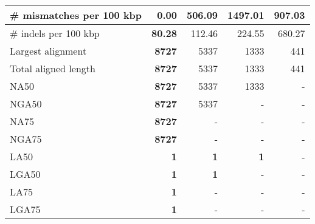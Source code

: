 \documentclass[12pt,a4paper]{article}
\begin{document}
\begin{table}[ht]
\begin{center}
\begin{tabular}{|l*{4}{|r}|}
\# mismatches per 100 kbp & {\bf 0.00} & 506.09 & 1497.01 & 907.03 \\ \hline
\# indels per 100 kbp & {\bf 80.28} & 112.46 & 224.55 & 680.27 \\ \hline
Largest alignment & {\bf 8727} & 5337 & 1333 & 441 \\ \hline
Total aligned length & {\bf 8727} & 5337 & 1333 & 441 \\ \hline
NA50 & {\bf 8727} & 5337 & 1333 & - \\ \hline
NGA50 & {\bf 8727} & 5337 & - & - \\ \hline
NA75 & {\bf 8727} & - & - & - \\ \hline
NGA75 & {\bf 8727} & - & - & - \\ \hline
LA50 & {\bf 1} & {\bf 1} & {\bf 1} & - \\ \hline
LGA50 & {\bf 1} & {\bf 1} & - & - \\ \hline
LA75 & {\bf 1} & - & - & - \\ \hline
LGA75 & {\bf 1} & - & - & - \\ \hline
\end{tabular}
\end{center}
\end{table}
\end{document}
